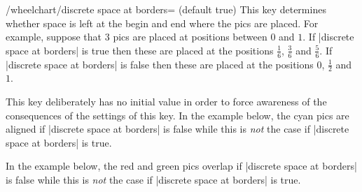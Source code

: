 \documentclass[a4paper,english,dvipsnames]{ltxdoc}
\begin{document}
\begin{key}{/wheelchart/discrete space at borders= (default true)}
This key determines whether space is left at the begin and end where the \tikzname{} pics are placed. For example, suppose that $3$ \tikzname{} pics are placed at positions between $0$ and $1$. If |discrete space at borders| is true then these are placed at the positions $\frac{1}{6}$, $\frac{3}{6}$ and $\frac{5}{6}$. If |discrete space at borders| is false then these are placed at the positions $0$, $\frac{1}{2}$ and $1$.

This key deliberately has no initial value in order to force awareness of the consequences of the settings of this key. In the example below, the cyan \tikzname{} pics are aligned if |discrete space at borders| is false while this is \emph{not} the case if |discrete space at borders| is true.
\begin{codeexample}[]
\end{codeexample}
In the example below, the red and green \tikzname{} pics overlap if |discrete space at borders| is false while this is \emph{not} the case if |discrete space at borders| is true.
\begin{codeexample}[]
\end{codeexample}
\end{key}
\end{document}

